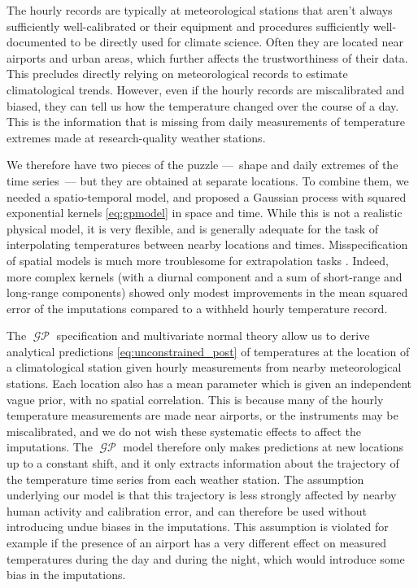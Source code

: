 \documentclass[letter]{article}
\DeclareMathOperator{\GP}{\mathcal{GP}}
\renewcommand{\cite}[1]{\citep{#1}}
\begin{document}
The hourly records are typically at meteorological stations
that aren't always sufficiently well-calibrated
or their equipment and procedures sufficiently well-documented
to be directly used for climate science.
Often they are located near airports and urban areas,
which further affects the trustworthiness of their data.
This precludes directly relying on meteorological records to estimate climatological trends.
However, even if the hourly records are miscalibrated and biased,
they can tell us how the temperature changed over the course of a day.
This is the information that is missing from daily measurements of temperature extremes made at research-quality weather stations.
    


        We therefore have two pieces of the puzzle ---~shape and daily extremes of the time series~--- but they are obtained at separate locations.
To combine them, we needed a spatio-temporal model, and proposed a Gaussian process with squared exponential kernels \eqref{eq:gpmodel} in space and time.
While this is not a realistic physical model, it is very flexible, and is generally adequate for the task of interpolating temperatures between nearby locations and times.
Misspecification of spatial models is much more troublesome for extrapolation tasks \cite{stein2012interpolation}.
Indeed, more complex kernels (with a diurnal component and a sum of short-range and long-range components) showed only modest improvements in the mean squared error of the imputations compared to a withheld hourly temperature record.

The \(\GP\) specification and multivariate normal theory allow us to derive analytical predictions \eqref{eq:unconstrained_post} of temperatures at the location of a climatological station given hourly measurements from nearby meteorological stations.
Each location also has a mean parameter which is given an independent vague prior, with no spatial correlation.
This is because many of the hourly temperature measurements are made near airports, or the instruments may be miscalibrated, and we do not wish these systematic effects to affect the imputations.
The \(\GP\) model therefore only makes predictions at new locations up to a constant shift, and it only extracts information about the trajectory of the temperature time series from each weather station.
The assumption underlying our model is that this trajectory is less strongly affected by nearby human activity and calibration error, and can therefore be used without introducing undue biases in the imputations.
This assumption is violated for example if the presence of an airport has a very different effect on measured temperatures during the day and during the night, which would introduce some bias in the imputations.
\end{document}
